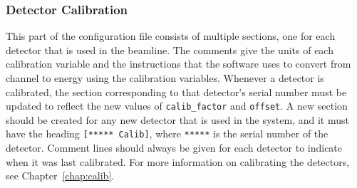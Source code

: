 \subsubsection{Detector Calibration}

This part of the configuration file consists of multiple sections, one for each detector that is used in the beamline. The comments give the units of each calibration variable and the instructions that the software uses to convert from channel to energy using the calibration variables. Whenever a detector is calibrated, the section corresponding to that detector's serial number must be updated to reflect the new values of \verb|calib_factor| and \texttt{offset}. A new section should be created for any new detector that is used in the system, and it must have the heading \verb|[***** Calib]|, where \verb|*****| is the serial number of the detector. Comment lines should always be given for each detector to indicate when it was last calibrated. For more information on calibrating the detectors, see Chapter~\ref{chap:calib}.
